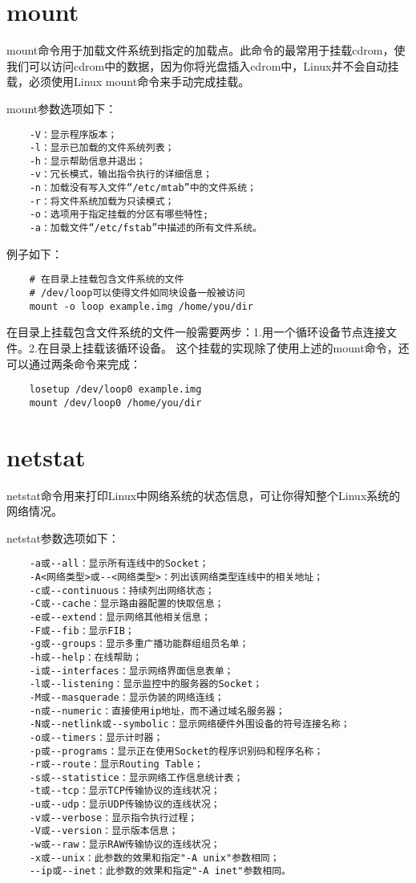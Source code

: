 \documentclass[a4paper,left=2.5cm,right=2.5cm,11pt]{article}
\begin{document}
\section{mount}
	mount命令用于加载文件系统到指定的加载点。此命令的最常用于挂载cdrom，使我们可以访问cdrom中的数据，因为你将光盘插入cdrom中，Linux并不会自动挂载，必须使用Linux mount命令来手动完成挂载。\par

	mount参数选项如下：
	\begin{lstlisting}
	-V：显示程序版本； 
	-l：显示已加载的文件系统列表； 
	-h：显示帮助信息并退出； 
	-v：冗长模式，输出指令执行的详细信息； 
	-n：加载没有写入文件“/etc/mtab”中的文件系统； 
	-r：将文件系统加载为只读模式； 
	-o：选项用于指定挂载的分区有哪些特性;
	-a：加载文件“/etc/fstab”中描述的所有文件系统。
	\end{lstlisting}

	例子如下：
	\begin{lstlisting}
	# 在目录上挂载包含文件系统的文件
	# /dev/loop可以使得文件如同块设备一般被访问
	mount -o loop example.img /home/you/dir
	\end{lstlisting}

	在目录上挂载包含文件系统的文件一般需要两步：1.用一个循环设备节点连接文件。2.在目录上挂载该循环设备。
	这个挂载的实现除了使用上述的mount命令，还可以通过两条命令来完成：
	\begin{lstlisting}
	losetup /dev/loop0 example.img
	mount /dev/loop0 /home/you/dir
	\end{lstlisting}

\section{netstat}
	netstat命令用来打印Linux中网络系统的状态信息，可让你得知整个Linux系统的网络情况。\par

	netstat参数选项如下：
	\begin{lstlisting}
	-a或--all：显示所有连线中的Socket； 
	-A<网络类型>或--<网络类型>：列出该网络类型连线中的相关地址； 
	-c或--continuous：持续列出网络状态； 
	-C或--cache：显示路由器配置的快取信息； 
	-e或--extend：显示网络其他相关信息； 
	-F或--fib：显示FIB； 
	-g或--groups：显示多重广播功能群组组员名单； 
	-h或--help：在线帮助； 
	-i或--interfaces：显示网络界面信息表单； 
	-l或--listening：显示监控中的服务器的Socket； 
	-M或--masquerade：显示伪装的网络连线； 
	-n或--numeric：直接使用ip地址，而不通过域名服务器； 
	-N或--netlink或--symbolic：显示网络硬件外围设备的符号连接名称； 
	-o或--timers：显示计时器； 
	-p或--programs：显示正在使用Socket的程序识别码和程序名称； 
	-r或--route：显示Routing Table； 
	-s或--statistice：显示网络工作信息统计表； 
	-t或--tcp：显示TCP传输协议的连线状况； 
	-u或--udp：显示UDP传输协议的连线状况； 
	-v或--verbose：显示指令执行过程； 
	-V或--version：显示版本信息； 
	-w或--raw：显示RAW传输协议的连线状况； 
	-x或--unix：此参数的效果和指定"-A unix"参数相同； 
	--ip或--inet：此参数的效果和指定"-A inet"参数相同。
	\end{lstlisting}
\end{document}
